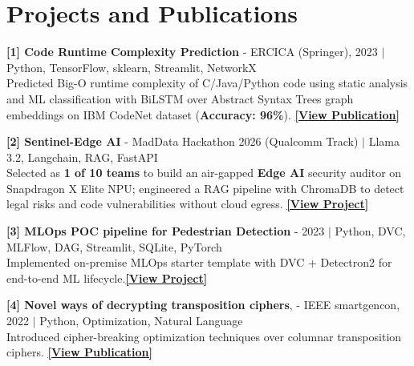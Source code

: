 \documentclass[letterpaper,11pt]{article}
\begin{document}
\section{Projects and Publications}

    \begin{itemize}[leftmargin=0.15in, label={}]
    \small{\item{
    \textbf{[1] Code Runtime Complexity Prediction} {- ERCICA (Springer), 2023 $|$ Python, TensorFlow, sklearn, Streamlit, NetworkX }\\
    {Predicted Big-O runtime complexity of C/Java/Python code using static analysis and ML classification with BiLSTM over Abstract Syntax Trees graph embeddings on IBM CodeNet dataset (\textbf{Accuracy: 96\%}).} {\href{https://doi.org/10.1007/978-981-99-7622-5_26}{\textbf{[View Publication]}}}\vspace{0.5pt}

    \textbf{[2] Sentinel-Edge AI} {- MadData Hackathon 2026 (Qualcomm Track) $|$ Llama 3.2, Langchain, RAG, FastAPI} \\
    {Selected as \textbf{1 of 10 teams} to build an air-gapped \textbf{Edge AI} security auditor on Snapdragon X Elite NPU; engineered a RAG pipeline with ChromaDB to detect legal risks and code vulnerabilities without cloud egress.} {\href{https://github.com/NikhilAdyapak/SentinelAI}{\textbf{[View Project]}}}\vspace{0.5pt}

    \textbf{[3] MLOps POC pipeline for Pedestrian Detection} {- 2023 $|$ Python, DVC, MLFlow, DAG, Streamlit, SQLite, PyTorch} \\
    {Implemented on-premise MLOps starter template with DVC + Detectron2 for end-to-end ML lifecycle.}{\href{https://github.com/NikhilAdyapak/DVC_Detectron2}{\textbf{[View Project]}}}}\vspace{0.5pt}

     \textbf{[4] Novel ways of decrypting transposition ciphers}, {- IEEE smartgencon, 2022} $|$ Python, Optimization, Natural Language\\
     {Introduced cipher-breaking optimization techniques over columnar transposition ciphers.}
     {\href{https://doi.org/10.1109/SMARTGENCON56628.2022.10083631}{\textbf{[View Publication]}}}
     }
    \end{itemize}
\end{document}
